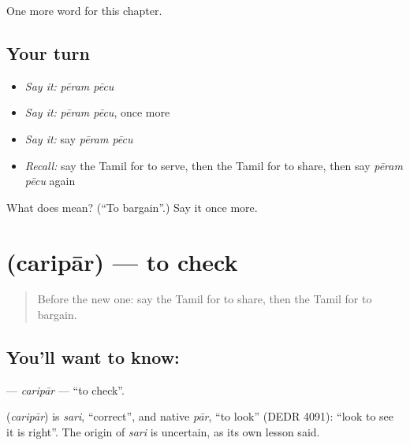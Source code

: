\begin{grammarlens}[title={What you've built}]
One more word for this chapter.
\end{grammarlens}

\subsection*{Your turn}
\begin{itemize}
\raggedright
  \item \emph{Say it:} \emph{pēram pēcu}
  \item \emph{Say it:} \emph{pēram pēcu}, once more
  \item \emph{Say it:} say \emph{pēram pēcu}
  \item \emph{Recall:} say the Tamil for to serve, then the Tamil for to share, then say \emph{pēram pēcu} again
\end{itemize}

\begin{tcolorbox}[breakable,colback=teal!4,colframe=teal!35!black,title={Before you move on}]
What does   mean? (\textquotedblleft{}To bargain\textquotedblright{}.) Say it once more.
\end{tcolorbox}
\section[\texorpdfstring{\ta{சரிபார்} (caripār)}{சரிபார் (caripār)}]{ (caripār) — to check}

\label{lesson:TA-C163-caripar}



\begin{quote}
Before the new one: say the Tamil for to share, then the Tamil for to bargain.
\end{quote}

\subsection*{You'll want to know: }
\textbf{} — \emph{caripār} — \textquotedblleft{}to check\textquotedblright{}.

\begin{cousinweb}
\textbf{} (\emph{caripār}) is \emph{sari}, \textquotedblleft{}correct\textquotedblright{}, and native \emph{pār}, \textquotedblleft{}to look\textquotedblright{} (DEDR 4091): \textquotedblleft{}look to see it is right\textquotedblright{}. The origin of \emph{sari} is uncertain, as its own lesson said.
\end{cousinweb}

